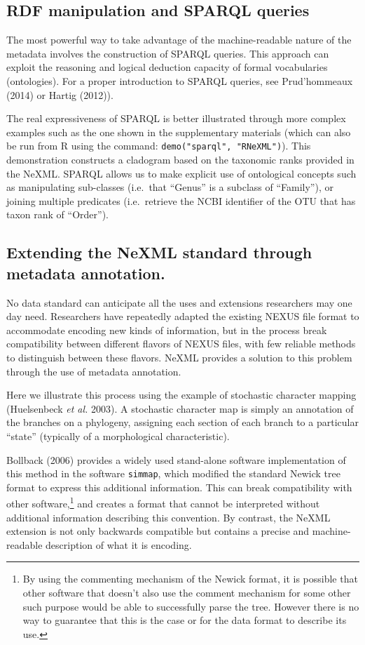 \documentclass[author-year, review, 11pt]{components/elsarticle} %
\begin{document}
\subsection{RDF manipulation and SPARQL
queries}\label{rdf-manipulation-and-sparql-queries}

The most powerful way to take advantage of the machine-readable nature
of the metadata involves the construction of SPARQL queries. This
approach can exploit the reasoning and logical deduction capacity of
formal vocabularies (ontologies). For a proper introduction to SPARQL
queries, see Prud'hommeaux (2014) or Hartig (2012)).

The real expressiveness of SPARQL is better illustrated through more
complex examples such as the one shown in the supplementary materials
(which can also be run from R using the command:
\texttt{demo("sparql", "RNeXML")}). This demonstration constructs a
cladogram based on the taxonomic ranks provided in the NeXML. SPARQL
allows us to make explicit use of ontological concepts such as
manipulating sub-classes (i.e.~that ``Genus'' is a subclass of
``Family''), or joining multiple predicates (i.e.~retrieve the NCBI
identifier of the OTU that has taxon rank of ``Order'').

\subsection{Extending the NeXML standard through metadata
annotation.}\label{extending-the-nexml-standard-through-metadata-annotation.}

No data standard can anticipate all the uses and extensions researchers
may one day need. Researchers have repeatedly adapted the existing NEXUS
file format to accommodate encoding new kinds of information, but in the
process break compatibility between different flavors of NEXUS files,
with few reliable methods to distinguish between these flavors. NeXML
provides a solution to this problem through the use of metadata
annotation.

Here we illustrate this process using the example of stochastic
character mapping (Huelsenbeck \emph{et al.} 2003). A stochastic
character map is simply an annotation of the branches on a phylogeny,
assigning each section of each branch to a particular ``state''
(typically of a morphological characteristic).

Bollback (2006) provides a widely used stand-alone software
implementation of this method in the software \texttt{simmap}, which
modified the standard Newick tree format to express this additional
information. This can break compatibility with other software,\footnote{By
  using the commenting mechanism of the Newick format, it is possible
  that other software that doesn't also use the comment mechanism for
  some other such purpose would be able to successfully parse the tree.
  However there is no way to guarantee that this is the case or for the
  data format to describe its use.} and creates a format that cannot be
interpreted without additional information describing this convention.
By contrast, the NeXML extension is not only backwards compatible but
contains a precise and machine-readable description of what it is
encoding.
\end{document}
